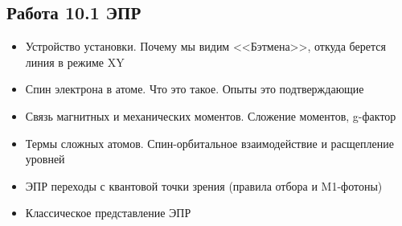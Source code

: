 \documentclass[12pt]{article}
\begin{document}

\subsection*{Работа 10.1 ЭПР}
\begin{itemize}
    \item Устройство установки. Почему мы видим <<Бэтмена>>, откуда берется линия в режиме XY
    \item Спин электрона в атоме. Что это такое. Опыты это подтверждающие
    \item Связь магнитных и механических моментов. Сложение моментов, g-фактор
    \item Термы сложных атомов. Спин-орбитальное взаимодействие и расщепление уровней
    \item ЭПР переходы с квантовой точки зрения (правила отбора и M1-фотоны)
    \item Классическое представление ЭПР
\end{itemize}
\end{document}
